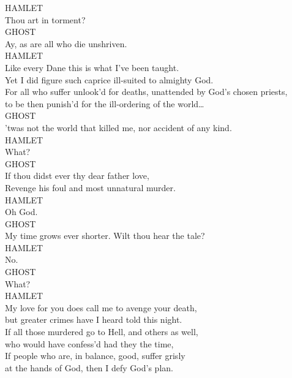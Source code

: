 \noindent{}HAMLET\\
Thou art in torment?\\

\noindent{}GHOST\\
Ay, as are all who die unshriven.\\

\noindent{}HAMLET\\
Like every Dane this is what I've been taught.\\
Yet I did figure such caprice ill-suited to almighty God.\\
For all who suffer unlook'd for deaths, unattended by God's chosen priests,\\
to be then punish'd for the ill-ordering of the world{\ldots}\\

\noindent{}GHOST\\
'twas not the world that killed me, nor accident of any kind.\\

\noindent{}HAMLET\\
What?\\

\noindent{}GHOST\\
If thou didst ever thy dear father love,\\
Revenge his foul and most unnatural murder.\\

\noindent{}HAMLET\\
Oh God.\\

\noindent{}GHOST\\
My time grows ever shorter. Wilt thou hear the tale?\\

\noindent{}HAMLET\\
No.\\

\noindent{}GHOST\\
What?\\

\noindent{}HAMLET\\
My love for you does call me to avenge your death,\\
but greater crimes have I heard told this night.\\
If all those murdered go to Hell, and others as well,\\
who would have confess'd had they the time,\\
If people who are, in balance, good, suffer grisly\\
at the hands of God, then I defy God's plan.\\

